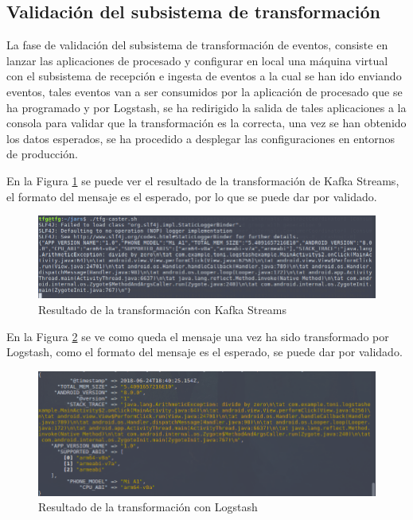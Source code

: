 \subsection{Validación del subsistema de transformación}
La fase de validación del subsistema de transformación de eventos, consiste en lanzar las aplicaciones de procesado y configurar en local una máquina virtual con el subsistema de recepción e ingesta de eventos a la cual se han ido enviando eventos, tales eventos van a ser consumidos por la aplicación de procesado que se ha programado y por Logstash, se ha redirigido la salida de tales aplicaciones a la consola para validar que la transformación es la correcta, una vez se han obtenido los datos esperados, se ha procedido a desplegar las configuraciones en entornos de producción.


En la Figura \ref{fig:crashout} se puede ver el resultado de la transformación de Kafka Streams, el formato del mensaje es el esperado, por lo que se puede dar por validado.

\begin{figure}[!htb]
	\centering
	\includegraphics[scale=0.60, width=\linewidth] {crashout.png}
	\caption{Resultado de la transformación con Kafka Streams}
	\label{fig:crashout}
\end{figure}

En la Figura \ref{fig:logstash} se ve como queda el mensaje una vez ha sido transformado por Logstash, como el formato del mensaje es el esperado, se puede dar por validado.

\begin{figure}[!htb]
	\centering
	\includegraphics[scale=0.60, width=\linewidth] {logstash.png}
	\caption{Resultado de la transformación con Logstash}
	\label{fig:logstash}
\end{figure}




